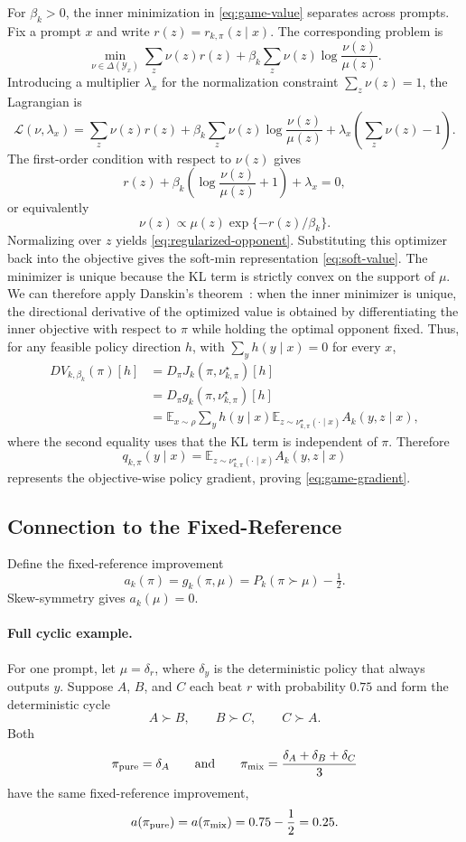 \documentclass{article}
\theoremstyle{remark}
\theoremstyle{plain}
\newcommand{\Y}{\mathcal{Y}}
\newcommand{\E}{\mathbb{E}}
\begin{document}
For $\beta_k>0$, the inner minimization in
\eqref{eq:game-value} separates across prompts. Fix a prompt $x$ and
write $r(z)=r_{k,\pi}(z\mid x)$. The corresponding problem is
\[
\min_{\nu\in\Delta(\Y_x)}
\sum_z \nu(z)r(z)
+
\beta_k\sum_z \nu(z)\log\frac{\nu(z)}{\mu(z)}.
\]
Introducing a multiplier $\lambda_x$ for the normalization constraint
$\sum_z\nu(z)=1$, the Lagrangian is
\[
\mathcal{L}(\nu,\lambda_x)
=
\sum_z \nu(z)r(z)
+
\beta_k\sum_z\nu(z)\log\frac{\nu(z)}{\mu(z)}
+
\lambda_x\!\left(\sum_z\nu(z)-1\right).
\]
The first-order condition with respect to $\nu(z)$ gives
\[
r(z)
+
\beta_k\!\left(
\log\frac{\nu(z)}{\mu(z)}+1
\right)
+
\lambda_x
=
0,
\]
or equivalently
\[
\nu(z)
\propto
\mu(z)\exp\{-r(z)/\beta_k\}.
\]
Normalizing over $z$ yields
\eqref{eq:regularized-opponent}. Substituting this optimizer back into
the objective gives the soft-min representation
\eqref{eq:soft-value}. The minimizer is unique because the KL term is strictly convex on the
support of $\mu$. We can therefore apply Danskin's
theorem~\citep{danskin1967theory}: when the inner minimizer is unique,
the directional derivative of the optimized value is obtained by
differentiating the inner objective with respect to $\pi$ while holding
the optimal opponent fixed. Thus, for any feasible policy direction
$h$, with $\sum_y h(y\mid x)=0$ for every $x$,
\begin{align}
D V_{k,\beta_k}(\pi)[h]
&=
D_\pi J_k(\pi,\nu^\star_{k,\pi})[h] \\
&=
D_\pi g_k(\pi,\nu^\star_{k,\pi})[h] \\
&=
\E_{x\sim\rho}\sum_y h(y\mid x)
\E_{z\sim\nu^\star_{k,\pi}(\cdot\mid x)}
A_k(y,z\mid x),
\end{align}
where the second equality uses that the KL term is independent of
$\pi$. Therefore
\[
q_{k,\pi}(y\mid x)
=
\E_{z\sim\nu^\star_{k,\pi}(\cdot\mid x)}
A_k(y,z\mid x)
\]
represents the objective-wise policy gradient, proving
\eqref{eq:game-gradient}.

\subsection{Connection to the Fixed-Reference}
\label{app:anchor-limit}
Define the fixed-reference improvement
\begin{equation}
a_k(\pi)=g_k(\pi,\mu)=P_k(\pi\succ\mu)-\tfrac12.
\label{eq:anchor-margin}
\end{equation}
Skew-symmetry gives $a_k(\mu)=0$.

\paragraph{Full cyclic example.}
For one prompt, let $\mu=\delta_r$, where $\delta_y$ is the deterministic
policy that always outputs $y$. Suppose $A$, $B$, and $C$ each beat $r$
with probability $0.75$ and form the deterministic cycle
\[
A\succ B,\qquad B\succ C,\qquad C\succ A.
\]
Both
\[
\pi_{\rm pure}=\delta_A
\qquad\text{and}\qquad
\pi_{\rm mix}=\frac{\delta_A+\delta_B+\delta_C}{3}
\]
have the same fixed-reference improvement,
\[
a(\pi_{\rm pure})
=
a(\pi_{\rm mix})
=
0.75-\frac12
=
0.25.
\]
\end{document}
